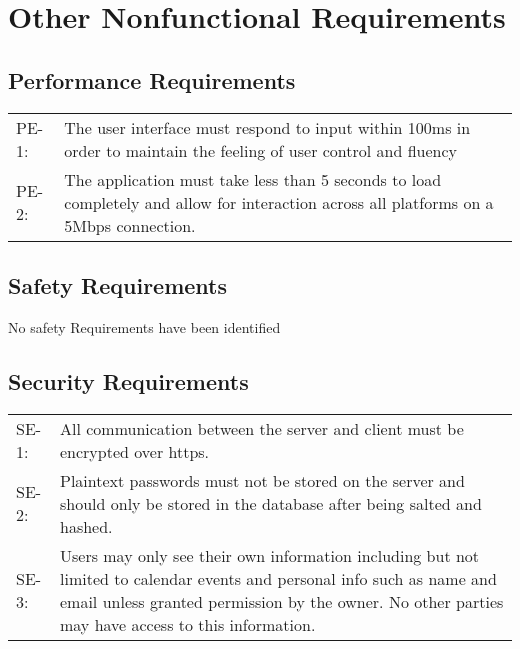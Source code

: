 \documentclass{scrreprt}
\begin{document}
\chapter{Other Nonfunctional Requirements}

\section{Performance Requirements}
\begin{center}
\begin{tabular}{ p{1.5cm} p{13cm} }
PE-1: & The user interface must respond to input within 100ms in order to maintain
the feeling of user control and fluency\\
PE-2: & The application must take less than 5 seconds to load completely and allow
for interaction across all platforms on a 5Mbps connection.
\end{tabular}
\end{center}

\section{Safety Requirements}
No safety Requirements have been identified

\section{Security Requirements}
\begin{center}
\begin{tabular}{ p{1.5cm} p{13cm} }
SE-1: & All communication between the server and client must be encrypted over https.\\
SE-2: & Plaintext passwords must not be stored on the server and should only be
stored in the database after being salted and hashed.\\
SE-3: & Users may only see their own information including but not limited to calendar
events and personal info such as name and email unless granted permission by the owner.
No other parties may have access to this information.
\end{tabular}
\end{center}
\end{document}
